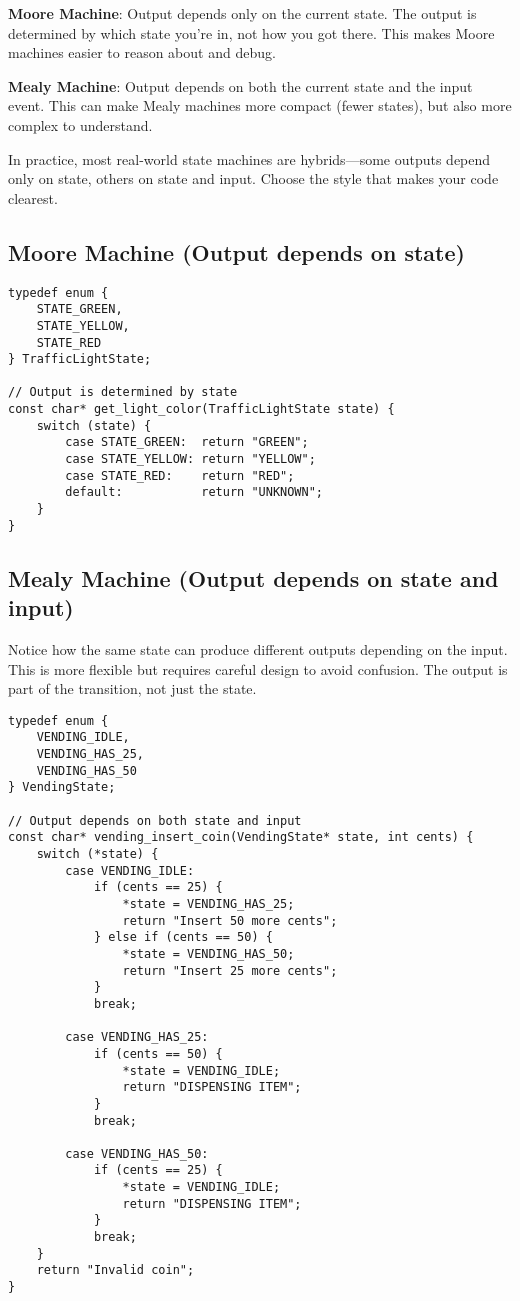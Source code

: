\textbf{Moore Machine}: Output depends only on the current state. The output is determined by which state you're in, not how you got there. This makes Moore machines easier to reason about and debug.

\textbf{Mealy Machine}: Output depends on both the current state and the input event. This can make Mealy machines more compact (fewer states), but also more complex to understand.

In practice, most real-world state machines are hybrids---some outputs depend only on state, others on state and input. Choose the style that makes your code clearest.

\subsection{Moore Machine (Output depends on state)}

\begin{lstlisting}
typedef enum {
    STATE_GREEN,
    STATE_YELLOW,
    STATE_RED
} TrafficLightState;

// Output is determined by state
const char* get_light_color(TrafficLightState state) {
    switch (state) {
        case STATE_GREEN:  return "GREEN";
        case STATE_YELLOW: return "YELLOW";
        case STATE_RED:    return "RED";
        default:           return "UNKNOWN";
    }
}
\end{lstlisting}

\subsection{Mealy Machine (Output depends on state and input)}

Notice how the same state can produce different outputs depending on the input. This is more flexible but requires careful design to avoid confusion. The output is part of the transition, not just the state.

\begin{lstlisting}
typedef enum {
    VENDING_IDLE,
    VENDING_HAS_25,
    VENDING_HAS_50
} VendingState;

// Output depends on both state and input
const char* vending_insert_coin(VendingState* state, int cents) {
    switch (*state) {
        case VENDING_IDLE:
            if (cents == 25) {
                *state = VENDING_HAS_25;
                return "Insert 50 more cents";
            } else if (cents == 50) {
                *state = VENDING_HAS_50;
                return "Insert 25 more cents";
            }
            break;

        case VENDING_HAS_25:
            if (cents == 50) {
                *state = VENDING_IDLE;
                return "DISPENSING ITEM";
            }
            break;

        case VENDING_HAS_50:
            if (cents == 25) {
                *state = VENDING_IDLE;
                return "DISPENSING ITEM";
            }
            break;
    }
    return "Invalid coin";
}
\end{lstlisting}

